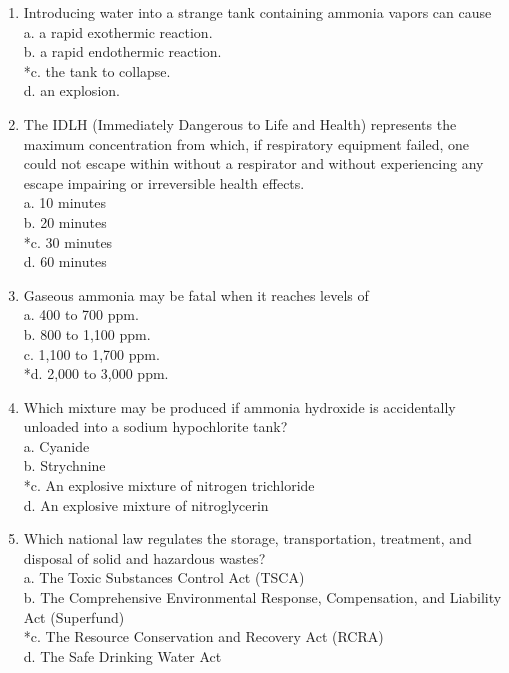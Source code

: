 \begin{enumerate}[1.]
\item Introducing water into a strange tank containing ammonia vapors can cause\\
a. a rapid exothermic reaction.\\
b. a rapid endothermic reaction.\\
*c. the tank to collapse.\\
d. an explosion.\\

  \item The IDLH (Immediately Dangerous to Life and Health) represents the maximum concentration from which, if respiratory equipment failed, one could not escape within without a respirator and without experiencing any escape impairing or irreversible health effects.\\
a. 10 minutes\\
b. 20 minutes\\
*c. 30 minutes\\
d. 60 minutes\\

  \item Gaseous ammonia may be fatal when it reaches levels of\\
a. 400 to 700 ppm.\\
b. 800 to 1,100 ppm.\\
c. 1,100 to 1,700 ppm.\\
*d. 2,000 to 3,000 ppm.\\

  \item Which mixture may be produced if ammonia hydroxide is accidentally unloaded into a sodium hypochlorite tank?\\
a. Cyanide\\
b. Strychnine\\
*c. An explosive mixture of nitrogen trichloride\\
d. An explosive mixture of nitroglycerin\\

  \item Which national law regulates the storage, transportation, treatment, and disposal of solid and hazardous wastes?\\
a. The Toxic Substances Control Act (TSCA)\\
b. The Comprehensive Environmental Response, Compensation, and Liability Act (Superfund)\\
*c. The Resource Conservation and Recovery Act (RCRA)\\
d. The Safe Drinking Water Act\\


\end{enumerate}
